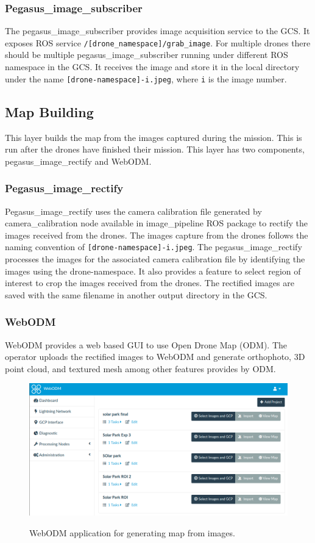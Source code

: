 \subsubsection{Pegasus\_image\_subscriber}

The pegasus\_image\_subscriber provides image acquisition service to the GCS. It exposes ROS service \texttt{/[drone\_namespace]/grab\_image}. For multiple drones there should be multiple pegasus\_image\_subscriber running under different ROS namespace in the GCS. It receives the image and store it in the local directory under the name \texttt{[drone-namespace]-i.jpeg}, where \texttt{i} is the image number.

\subsection{Map Building}
This layer builds the map from the images captured during the mission. This is run after the drones have finished their mission. This layer has two components, pegasus\_image\_rectify and WebODM.

\subsubsection{Pegasus\_image\_rectify}
Pegasus\_image\_rectify uses the camera calibration file generated by camera\_calibration node available in image\_pipeline ROS package to rectify the images received from the drones. The images capture from the drones follows the naming convention of \texttt{[drone-namespace]-i.jpeg}. The pegasus\_image\_rectify processes the images for the associated camera calibration file by identifying the images using the drone-namespace. It also provides a feature to select region of interest to crop the images received from the drones. The rectified images are saved with the same filename in another output directory in the GCS.

\subsubsection{WebODM}
WebODM provides a web based GUI to use Open Drone Map (ODM). The operator uploads the rectified images to WebODM and generate orthophoto, 3D point cloud, and textured mesh among other features provides by ODM.
\begin{figure}
	\centering
	\caption[WebODM]{\small WebODM application for generating map from images.} 
	\includegraphics[width=6in]{figures/methodology/webodm}
	\label{fig:webodm}
\end{figure}

